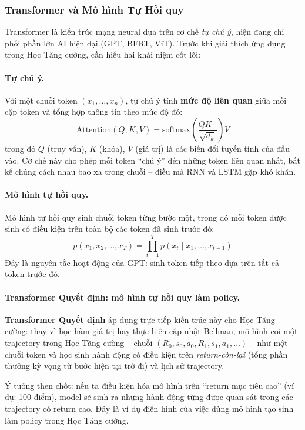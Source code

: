\subsubsection{Transformer và Mô hình Tự Hồi quy}
 
Transformer là kiến trúc mạng neural dựa trên cơ chế
\textit{tự chú ý}, hiện đang chi phối phần lớn AI hiện đại (GPT,
BERT, ViT). Trước khi giải thích ứng dụng trong Học Tăng cường, cần hiểu hai khái
niệm cốt lõi:

\paragraph{Tự chú ý.}

Với một chuỗi token $(x_1, \ldots, x_n)$, tự chú ý tính
\textbf{mức độ liên quan} giữa mỗi cặp token và tổng hợp thông tin
theo mức độ đó:
\[
    \text{Attention}(Q, K, V) = \text{softmax}\!\left(
    \frac{QK^\top}{\sqrt{d_k}}\right) V
\]
trong đó $Q$ (truy vấn), $K$ (khóa), $V$ (giá trị) là các biến đổi tuyến
tính của đầu vào. Cơ chế này cho phép mỗi token ``chú ý'' đến những
token liên quan nhất, bất kể chúng cách nhau bao xa trong chuỗi --
điều mà RNN và LSTM gặp khó khăn.

\paragraph{Mô hình tự hồi quy.}

Mô hình tự hồi quy sinh chuỗi token từng bước một, trong đó mỗi
token được sinh có điều kiện trên toàn bộ các token đã sinh trước đó:
\[
    p(x_1, x_2, \ldots, x_T) = \prod_{t=1}^{T} p(x_t \mid x_1, \ldots,
    x_{t-1})
\]
Đây là nguyên tắc hoạt động của GPT: sinh token tiếp theo dựa trên
tất cả token trước đó.

\paragraph{Transformer Quyết định: mô hình tự hồi quy làm policy.}

\textbf{Transformer Quyết định} \cite{chen2021decision} áp dụng trực
tiếp kiến trúc này cho Học Tăng cường: thay vì học hàm giá trị hay thực hiện
cập nhật Bellman, mô hình coi một trajectory trong Học Tăng cường -- chuỗi
$(R_0, s_0, a_0, R_1, s_1, a_1, \ldots)$ -- như một chuỗi token và
học sinh hành động có điều kiện trên \textit{return-còn-lại} (tổng
phần thưởng kỳ vọng từ bước hiện tại trở đi) và lịch sử trajectory.

Ý tưởng then chốt: nếu ta điều kiện hóa mô hình trên ``return mục tiêu
cao'' (ví dụ: 100 điểm), model sẽ sinh ra những hành động từng được
quan sát trong các trajectory có return cao. Đây là ví dụ điển hình
của việc dùng mô hình tạo sinh làm policy trong Học Tăng cường.

